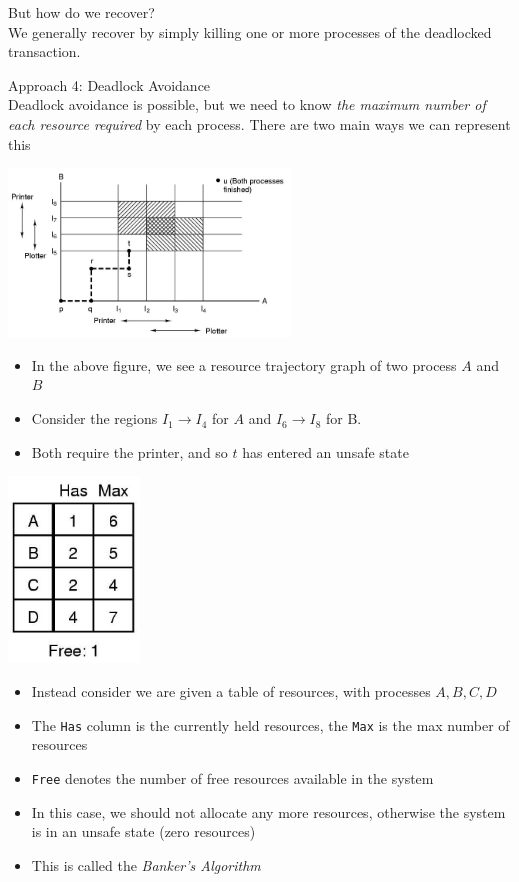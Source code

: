 \documentclass[journal, letterpaper]{IEEEtran}
\begin{document}
\begin{aside}{But how do we recover?} \\
    We generally recover by simply killing one or more processes of the deadlocked transaction.
\end{aside}
\begin{theory}{Approach 4: Deadlock Avoidance} \\
    Deadlock avoidance is possible, but we need to know \textit{the maximum number of each resource required} by each process. There are two main ways we can represent this
\begin{center}
    \includegraphics[width=7.5cm]{./photos/resource_trajectories.png}
\end{center}
    \begin{itemize}
        \item In the above figure, we see a resource trajectory graph of two process $A$ and $B$
        \item Consider the regions $I_1 \to I_4$ for $A$ and $I_6 \to I_8$ for B.
        \item Both require the printer, and so $t$ has entered an unsafe state 
    \end{itemize}
\begin{center}
    \includegraphics[width=3.5cm]{./photos/bankers_algo.png}
\end{center}
\begin{itemize}
    \item Instead consider we are given a table of resources, with processes $A, B, C, D$
    \item The \verb|Has| column is the currently held resources, the \verb|Max| is the max number of resources
    \item \verb|Free| denotes the number of free resources available in the system
    \item In this case, we should not allocate any more resources, otherwise the system is in an unsafe state (zero resources)
    \item This is called the \textit{Banker's Algorithm}
\end{itemize}
\end{theory}
\end{document}
